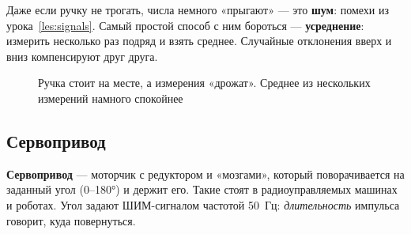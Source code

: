Даже если ручку не трогать, числа немного «прыгают» --- это \textbf{шум}: помехи из урока~\ref{les:signals}.
Самый простой способ с ним бороться --- \textbf{усреднение}: измерить несколько раз подряд и взять среднее.
Случайные отклонения вверх и вниз компенсируют друг друга.

\begin{figure}[H]
\centering
{}
\caption{Ручка стоит на месте, а измерения «дрожат». Среднее из нескольких измерений намного спокойнее}
\end{figure}

\subsection{Сервопривод}

\textbf{Сервопривод} --- моторчик с редуктором и «мозгами», который поворачивается на заданный угол
(0--180°) и держит его. Такие стоят в радиоуправляемых машинах и роботах. Угол задают ШИМ-сигналом
частотой 50~Гц: \emph{длительность} импульса говорит, куда повернуться.

